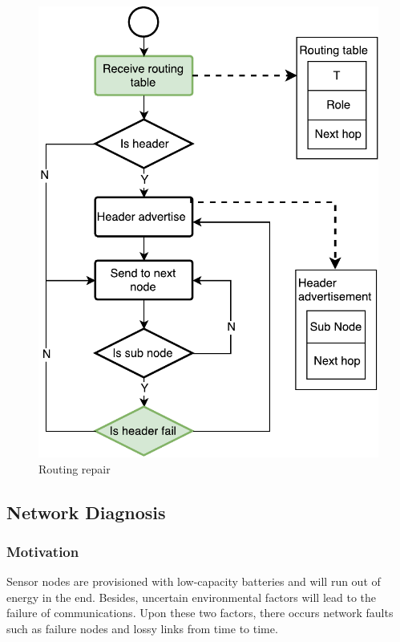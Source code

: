 \begin{figure}[htbp]
	\centering
	\includegraphics[width=.85\columnwidth]{Figure/routing-flow}
	\vspace{-0.1in}
	\caption{Routing repair}
	\label{routing-flow}
	\vspace{-0.2in}
\end{figure}





\subsection{Network Diagnosis}

\subsubsection{Motivation}

Sensor nodes are provisioned with low-capacity batteries and will run out of energy in the end. 
Besides, uncertain environmental factors will lead to the failure of communications.
Upon these two factors, there occurs network faults such as failure nodes and lossy links from time to time.

